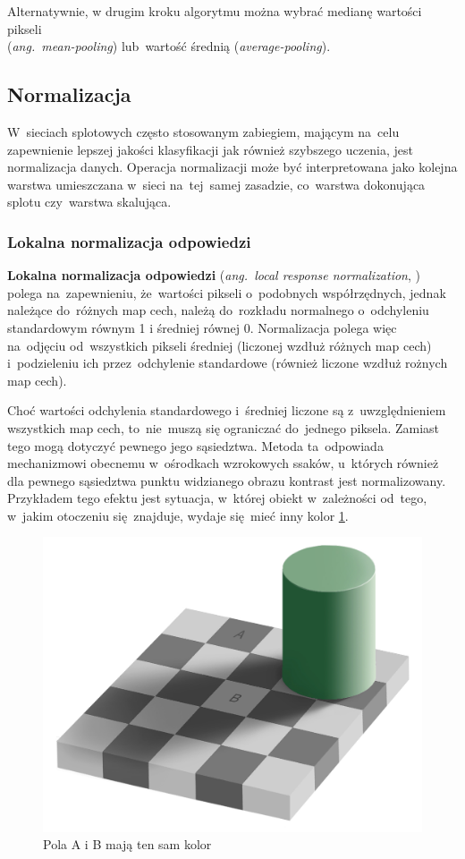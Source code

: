 Alternatywnie, w drugim kroku algorytmu można wybrać medianę wartości pikseli\\
(\textit{ang.~mean-pooling}) lub~wartość średnią (\textit{average-pooling}).

\subsection{Normalizacja}
W~sieciach splotowych często stosowanym zabiegiem, mającym na~celu zapewnienie lepszej jakości klasyfikacji jak również
szybszego uczenia, jest normalizacja danych. Operacja normalizacji może być interpretowana jako kolejna warstwa
umieszczana w~sieci na~tej~samej zasadzie, co~warstwa dokonująca splotu czy~warstwa skalująca.

\subsubsection{Lokalna normalizacja odpowiedzi} \label{sssec:normalizacja_odpowiedzi}
\textbf{Lokalna normalizacja odpowiedzi} (\textit{ang.~local response normalization}, \cite{HOG}) polega na~zapewnieniu,
że~wartości pikseli o~podobnych współrzędnych, jednak należące do~różnych map cech, należą do~rozkładu normalnego
o~odchyleniu standardowym równym 1 i średniej równej 0. Normalizacja polega więc na~odjęciu od~wszystkich pikseli
średniej (liczonej wzdłuż różnych map cech) i~podzieleniu ich przez~odchylenie standardowe (również liczone wzdłuż
rożnych map cech).

Choć wartości odchylenia standardowego i~średniej liczone są z~uwzględnieniem wszystkich map cech, to~nie~muszą
się ograniczać do~jednego piksela. Zamiast tego mogą dotyczyć pewnego jego sąsiedztwa. Metoda ta~odpowiada
mechanizmowi obecnemu w~ośrodkach wzrokowych ssaków, u~których również dla pewnego sąsiedztwa punktu widzianego
obrazu kontrast jest normalizowany. Przykładem tego efektu jest sytuacja, w~której obiekt w~zależności od~tego,
w~jakim otoczeniu się~znajduje, wydaje się~mieć inny kolor \ref{img:chess-illusion}.

\begin{figure}[H]
	\centering
	\includegraphics[width=0.8\linewidth]{img/chess-illusion.png}
	\caption{Pola A i B mają ten sam kolor}
	\label{img:chess-illusion}
\end{figure}

